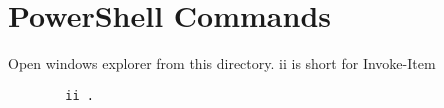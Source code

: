 \documentclass[../LabBook]{subfiles}
\begin{document}
\section{PowerShell Commands}

    Open windows explorer from this directory. ii is short for Invoke-Item
    \begin{verbatim}
        ii .
    \end{verbatim}
\end{document}

